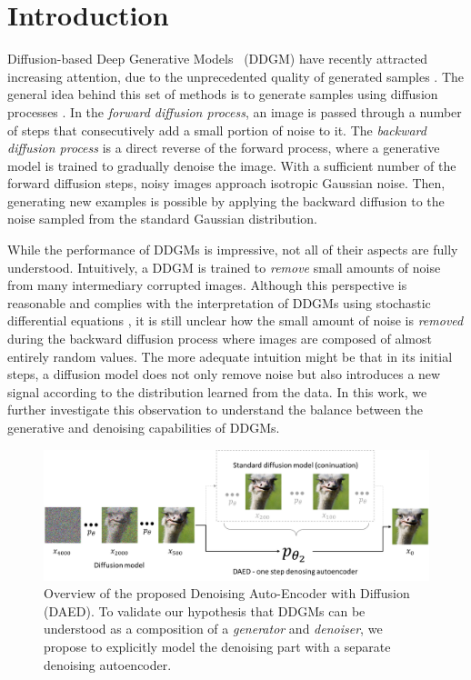 \section{Introduction} 

Diffusion-based Deep Generative Models~\cite{sohl2015deep} (DDGM) have recently attracted increasing attention, due to the unprecedented quality of generated samples \cite{dhariwal2021diffusion, ho2022cascaded, kingma2021variational}. The general idea behind this set of methods is to generate samples using diffusion processes \cite{ho2020denoising, huang2021variational, kingma2021variational,song2019generative, song2020score}. 
In the \emph{forward diffusion process}, an image is passed through a number of steps that consecutively add a small portion of noise to it. The \emph{backward diffusion process} is a direct reverse of the forward process, where a generative model is trained to gradually denoise the image. With a sufficient number of the forward diffusion steps, noisy images approach isotropic Gaussian noise. Then, generating new examples is possible by applying the backward diffusion to the noise sampled from the standard Gaussian distribution.

While the performance of DDGMs is impressive, not all of their aspects are fully understood. Intuitively, a DDGM is trained to \emph{remove} small amounts of noise from many intermediary corrupted images. Although this perspective is reasonable and complies with the interpretation of DDGMs using stochastic differential equations \cite{huang2021variational, song2020score}, it is still unclear how the small amount of noise is \emph{removed} during the backward diffusion process where images are composed of almost entirely random values. The more adequate intuition might be that in its initial steps, a diffusion model does not only remove noise but also introduces a new signal according to the distribution learned from the data. In this work, we further investigate this observation to understand the balance between the generative and denoising capabilities of DDGMs.


\begin{figure}[t!]
	\centering
    \includegraphics[width=1.05\linewidth]{pics/4_daed/teaser.png}
	\caption{Overview of the proposed Denoising Auto-Encoder with Diffusion (DAED). To validate our hypothesis that DDGMs can be understood as a composition of a \emph{generator} and \emph{denoiser}, we propose to explicitly model the denoising part with a separate denoising autoencoder.}
	\label{fig:teaser}
\end{figure}


